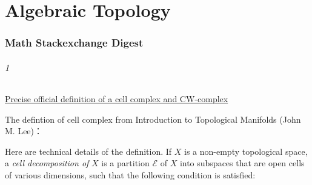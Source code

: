 \part{Algebraic Topology}
\section{Math Stackexchange Digest}
\paragraph{1}\href{https://math.stackexchange.com/questions/42005}{Precise official definition of a cell complex and CW-complex}

The defintion of cell complex from Introduction to Topological Manifolds (John M. Lee)：

   Here are technical details of the definition. If $X$ is a non-empty topological space, a {\it cell decomposition of} $X$ is a partition $\mathcal{E}$ of $X$ into subspaces that are open cells of various dimensions, such that the following condition is satisfied:
   
